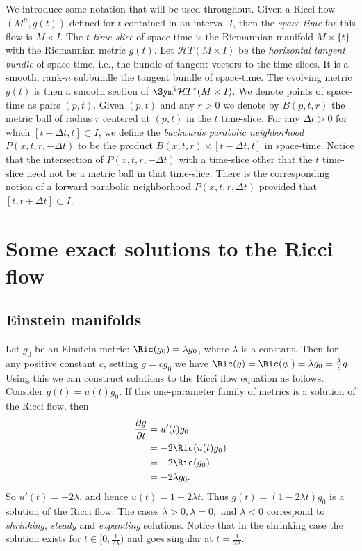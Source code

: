 \begin{definition}\label{def:space-time}
\label{defnRicci}
We introduce some notation that will be used throughout. Given a
Ricci flow $(M^n,g(t))$ defined for $t$ contained in an interval
$I$, then the {\sl space-time} for this flow is  $M\times I$.  The
{\sl $t$ time-slice} of space-time is the Riemannian manifold
$M\times\{t\}$ with the Riemannian metric $g(t)$. Let ${\mathcal
HT}(M\times I)$ be the {\em horizontal tangent
bundle} of space-time, i.e., the
bundle of tangent vectors to the time-slices. It is a smooth,
rank-$n$ subbundle the tangent bundle of space-time. The evolving
metric $g(t)$ is then a smooth section of $\Sym^2{\mathcal
HT}^*(M\times I)$. We denote points of space-time as pairs $(p,t)$.
Given $(p,t)$ and any $r>0$ we denote by $B(p,t,r)$ the metric ball
of radius $r$ centered at $(p,t)$ in the $t$ time-slice. For any
$\Delta t>0$ for which $[t-\Delta t,t]\subset I$, we define the {\sl
backwards parabolic neighborhood}
$P(x,t,r,-\Delta t)$ to be the product $B(x,t,r)\times
[t-\Delta t,t]$ in space-time. Notice that the intersection of
$P(x,t,r,-\Delta t)$ with a time-slice other that the $t$ time-slice
need not be a metric ball in that time-slice. There is the
corresponding notion of a forward parabolic neighborhood
$P(x,t,r,\Delta t)$ provided that $[t,t+\Delta t]\subset I$.
\end{definition}






\section{Some exact solutions to the Ricci flow}

\subsection{Einstein manifolds}
Let $g_0$ be an Einstein metric: $\Ric(g_0) = \lambda g_0$, where $\lambda$ is a constant. Then for
any positive constant $c$, setting $g = cg_0$ we have $\Ric(g)
= \Ric(g_0) = \lambda g_0= \frac{\lambda}{c} g.$ Using this we
can construct solutions to the Ricci flow equation as follows.
Consider $g(t) = u(t)g_{0}$. If this one-parameter family of
metrics is a solution of the Ricci flow, then
\begin{align*}
\frac{\partial g}{\partial t}& =u'(t)g_{0}\\& = -2\Ric(u(t)g_{0})\\&
= -2\Ric(g_{0})\\& = -2\lambda g_{0}.
\end{align*}
So $u'(t)= -2\lambda$,  and hence $u(t) = 1-2 \lambda t$. Thus
$g(t)= (1-2 \lambda t)g_{0}$ is a solution of the Ricci flow. The
cases $\lambda
>0, \lambda=0,$ and $\lambda< 0$ correspond to \textit{shrinking}, \textit{steady}
and \textit{expanding} solutions. Notice that in the shrinking case the
solution exists for $t\in [0,\frac{1}{2\lambda})$ and goes singular at
$t=\frac{1}{2\lambda}$.

